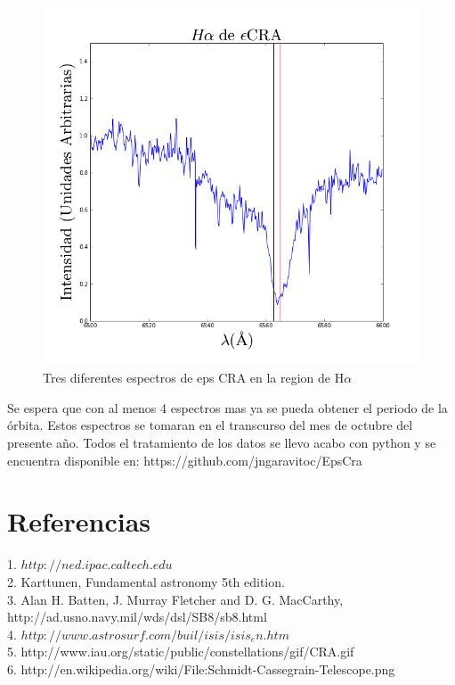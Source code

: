 \documentclass[Proceedings]{ascelike}
\begin{document}
\begin{figure}
\includegraphics[scale=0.33]{ha3.png}
\caption{Tres diferentes espectros de eps CRA en la region de H$\alpha$\label{ha}}
\end{figure}

Se espera que con al menos 4 espectros mas ya se pueda obtener el periodo de la \'orbita. 
Estos espectros se tomaran en el transcurso del mes de octubre del presente año. 
Todos el tratamiento de los datos se llevo acabo con python y se encuentra disponible en:
https://github.com/jngaravitoc/EpsCra



\section{Referencias}

1. $http://ned.ipac.caltech.edu$  \\
2. Karttunen, Fundamental astronomy 5th edition.\\
3. Alan H. Batten, J. Murray Fletcher and D. G. MacCarthy, http://ad.usno.navy.mil/wds/dsl/SB8/sb8.html\\
4. $http://www.astrosurf.com/buil/isis/isis_en.htm$\\
5. http://www.iau.org/static/public/constellations/gif/CRA.gif \\
6. http://en.wikipedia.org/wiki/File:Schmidt-Cassegrain-Telescope.png \\
\end{document}
